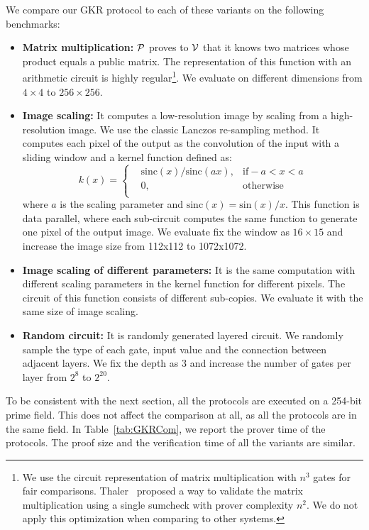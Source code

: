 We compare our GKR protocol to each of these variants on the following benchmarks:
\begin{itemize}
	\item
	\textbf{Matrix multiplication:} $\P$ proves to $\V$ that it knows two matrices whose product equals a public matrix. The representation of this function with an arithmetic circuit is highly regular\footnote{We use the circuit representation of matrix multiplication with $n^3$ gates for fair comparisons. Thaler~\cite{t13} proposed a way to validate the matrix multiplication using a single sumcheck with prover complexity $n^2$. We do not apply this optimization when comparing to other systems.}. We evaluate on different dimensions from $4\times4$ to $256\times256$. 
	\item
	\textbf{Image scaling:} It computes a low-resolution image by scaling from a high-resolution image. We use the classic Lanczos re-sampling\cite{Lanczos} method. It computes each pixel of the output as the convolution of the input with a sliding window and a kernel function defined as:
	\begin{equation}
	k(x)=\left\{
	\begin{aligned}
	&\text{sinc}(x)/\text{sinc}(ax), &\text{if} -a < x < a\\
	&0, &\text{otherwise}\\
	\end{aligned}
	\right.\nonumber
	\end{equation}
	where $a$ is the scaling parameter and $\text{sinc}(x) = \text{sin}(x)/x$. This function is data parallel, where each sub-circuit computes the same function to generate one pixel of the output image. We evaluate fix the window as $16\times15$ and increase the image size from 112x112 to 1072x1072.
	\item
	\textbf{Image scaling of different parameters:} It is the same computation with different scaling parameters in the kernel function for different pixels.
	The circuit of this function consists of different sub-copies. We evaluate it with the same size of image scaling.
	\item
	\textbf{Random circuit:} It is randomly generated layered circuit. We randomly sample the type of each gate, input value and the connection between adjacent layers. We fix the depth as 3 and increase the number of gates per layer from $2^8$ to $2^{20}$.
\end{itemize}
To be consistent with the next section, all the protocols are executed on a 254-bit prime field. This does not affect the comparison at all, as all the protocols are in the same field. In Table~\ref{tab:GKRCom}, we report the prover time of the protocols. The proof size and the verification time of all the variants are similar.

